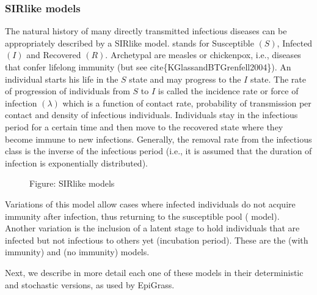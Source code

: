 \documentclass[letterpaper,10pt,english]{sphinxmanual}
\begin{document}
\subsubsection{SIR\sphinxhyphen{}like models}
\label{\detokenize{intromodels:sir-like-models}}
The natural history of many directly transmitted infectious diseases can be appropriately described by a SIR\sphinxhyphen{}like model.
 stands for Susceptible \((S)\), Infected \((I)\) and Recovered \((R)\). Archetypal  are measles
or chickenpox, i.e., diseases that confer lifelong immunity (but see cite\{KGlassandBTGrenfell2004\}).
An individual starts his life in the \(S\) state and may progress to the \(I\) state. The rate of progression of
individuals from \(S\) to \(I\) is called the incidence rate or force of infection \((\lambda)\) which is a
function of contact rate, probability of transmission per contact and density of infectious individuals. Individuals
stay in the infectious period for a certain time and then move to the recovered state where they become immune to new
infections. Generally, the removal rate from the infectious class is the inverse of the infectious
period (i.e., it is assumed that the duration of infection is exponentially distributed).

\begin{figure}[htbp]
\centering
\capstart

\noindent{}
\caption{Figure: SIR\sphinxhyphen{}like models}\label{\detokenize{intromodels:id1}}\label{\detokenize{intromodels:fig-sir}}\end{figure}

Variations of this model allow cases where infected individuals do not acquire immunity after infection, thus returning to the susceptible pool ( model). Another variation is the inclusion of a latent stage to hold individuals that are infected but not infectious to others yet (incubation period). These are the  (with immunity) and  (no immunity) models.

Next, we describe in more detail each one of these models in their deterministic and stochastic versions, as used by EpiGrass.
\end{document}
